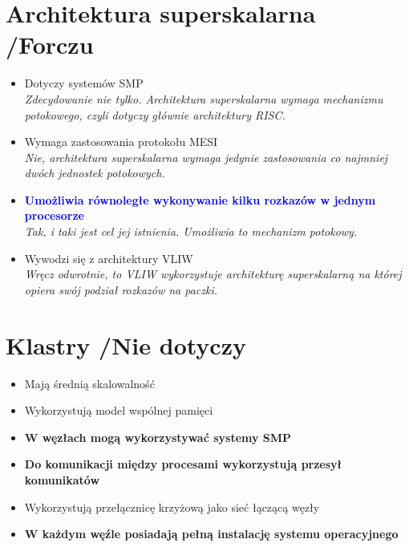 \documentclass[a4paper,twoside]{article}
\begin{document}
\section{Architektura superskalarna {\small /Forczu}}
	\begin{itemize}
    \item Dotyczy systemów SMP\\
    {\small \emph{Zdecydowanie nie tylko. Architektura superskalarna wymaga mechanizmu potokowego, czyli dotyczy głównie architektury RISC.}}
    \item Wymaga zastosowania protokołu MESI\\
    {\small \emph{Nie, architektura superskalarna wymaga jedynie zastosowania co najmniej dwóch jednostek potokowych.}}
    \item \textcolor{Blue}{\textbf{Umożliwia równoległe wykonywanie kilku rozkazów w jednym procesorze}}\\
    {\small \emph{Tak, i taki jest cel jej istnienia. Umożliwia to mechanizm potokowy.}}
    \item Wywodzi się z architektury VLIW\\
    {\small \emph{Wręcz odwrotnie, to VLIW wykorzystuje architekturę superskalarną na której opiera swój podział rozkazów na paczki.}}
    \end{itemize}

\section{Klastry {\small /Nie dotyczy}}
	\begin{itemize}
    \item Mają średnią skalowalność
    \item Wykorzystują model wspólnej pamięci
    \item \textbf{W węzłach mogą wykorzystywać systemy SMP}
    \item \textbf{Do komunikacji między procesami wykorzystują przesył komunikatów}
    \item Wykorzystują przełącznicę krzyżową jako sieć łączącą węzły
    \item \textbf{W każdym węźle posiadają pełną instalację systemu operacyjnego}
    \end{itemize}
\end{document}
